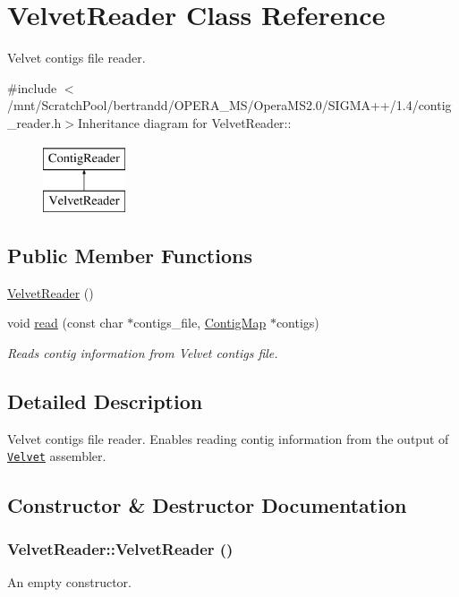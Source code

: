 \hypertarget{classVelvetReader}{
\section{VelvetReader Class Reference}
\label{classVelvetReader}
}


Velvet contigs file reader.  


{\ttfamily \#include $<$/mnt/ScratchPool/bertrandd/OPERA\_\-MS/OperaMS2.0/SIGMA++/1.4/contig\_\-reader.h$>$}Inheritance diagram for VelvetReader::\begin{figure}[H]
\begin{center}
\leavevmode
\includegraphics[height=2cm]{classVelvetReader}
\end{center}
\end{figure}
\subsection*{Public Member Functions}
\begin{DoxyCompactItemize}
\item 
\hyperlink{classVelvetReader_a94428db9b6e554a49a4cb22fd5ceec7a}{VelvetReader} ()
\item 
void \hyperlink{classVelvetReader_a0121c85cb0fefcc3f0c52f134756ed2e}{read} (const char $\ast$contigs\_\-file, \hyperlink{contig_8h_aa2acb8d3b78def617ec4509a1f684c4e}{ContigMap} $\ast$contigs)
\begin{DoxyCompactList}\small\item\em Reads contig information from Velvet contigs file. \item\end{DoxyCompactList}\end{DoxyCompactItemize}


\subsection{Detailed Description}
Velvet contigs file reader. Enables reading contig information from the output of \href{https://www.ebi.ac.uk/~zerbino/velvet/}{\tt Velvet} assembler. 

\subsection{Constructor \& Destructor Documentation}
\hypertarget{classVelvetReader_a94428db9b6e554a49a4cb22fd5ceec7a}{
\subsubsection[{VelvetReader}]{\setlength{\rightskip}{0pt plus 5cm}VelvetReader::VelvetReader ()}}
\label{classVelvetReader_a94428db9b6e554a49a4cb22fd5ceec7a}
An empty constructor. 

